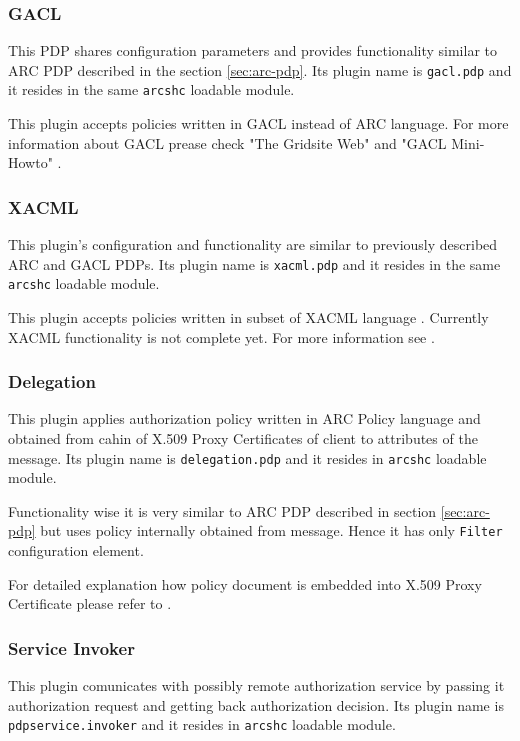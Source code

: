 \documentclass{article}
\begin{document}
\subsubsection{GACL}\label{gacl-pdp}
This PDP shares configuration parameters and provides functionality similar to ARC PDP
described in the section \ref{sec:arc-pdp}. Its plugin name is \texttt{gacl.pdp} and it
resides in the same \texttt{arcshc} loadable module.

This plugin accepts policies written in GACL instead of ARC language. For more information
about GACL prease check "The Gridsite Web" \cite{gacl} and "GACL Mini-Howto" \cite{gacl-mini}.

\subsubsection{XACML}\label{xacml-pdp}
This plugin's configuration and functionality are similar to previously described ARC and
GACL PDPs.  Its plugin name is \texttt{xacml.pdp} and it resides in the same \texttt{arcshc}
loadable module.

This plugin accepts policies written in subset of XACML language \cite{xacml}. Currently
XACML functionality is not complete yet. For more information see \cite{arc1-sec}.

\subsubsection{Delegation}\label{sec:delegation-pdp}
This plugin applies authorization policy written in ARC Policy language and obtained
from cahin of X.509 Proxy Certificates of client to attributes of the message. Its
plugin name is \texttt{delegation.pdp} and it resides in \texttt{arcshc} loadable module.

Functionality wise it is very similar to ARC PDP described in section \ref{sec:arc-pdp}
but uses policy internally obtained from message. Hence it has only \texttt{Filter}
configuration element.

For detailed explanation how policy document is embedded into X.509 Proxy Certificate
please refer to \cite{arc1-sec}.

\subsubsection{Service Invoker}\label{service-pdp}
This plugin comunicates with possibly remote authorization service by passing it authorization
request and getting back authorization decision. Its plugin name is \texttt{pdpservice.invoker}
and it resides in \texttt{arcshc} loadable module.
\end{document}
